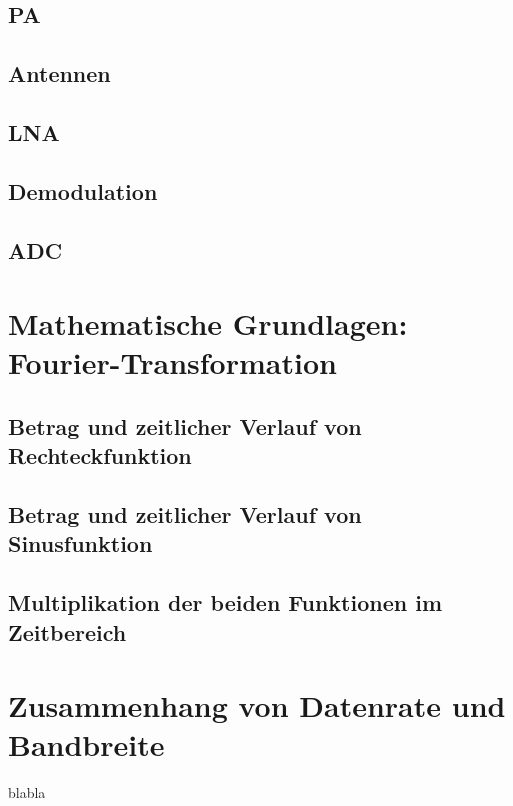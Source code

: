 \subsection{PA}
\subsection{Antennen}
\subsection{LNA}
\subsection{Demodulation}
\subsection{ADC}


\section{Mathematische Grundlagen: Fourier-Transformation}
\subsection{Betrag und zeitlicher Verlauf von Rechteckfunktion}
\subsection{Betrag und zeitlicher Verlauf von Sinusfunktion}
\subsection{Multiplikation der beiden Funktionen im Zeitbereich}


\section{Zusammenhang von Datenrate und Bandbreite}
blabla
\clearpage
